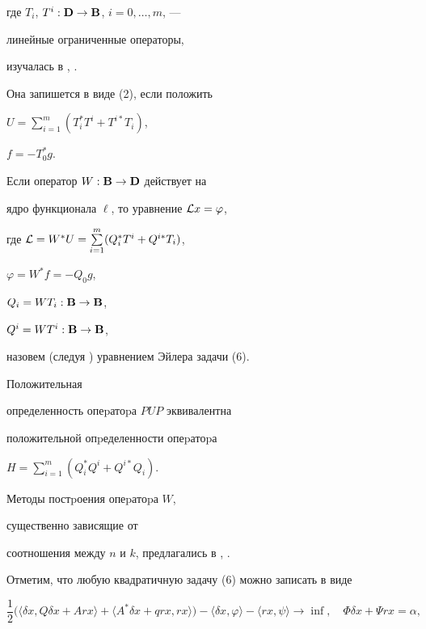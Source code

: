 где $T_i$, $T^i:\bold D\to\bold B$, $i=0,\dotsc,m$, ---


линейные ограниченные операторы,


изучалась в \cite{AR}, \cite{G}.


Она запишется в виде (2), если положить


$U=\sum\limits_{i=1}^m(T_i^*T^i+T^{i*}T_i)$,


$f=-T_0^*g$.





Если оператор $W:\bold B\to\bold D$ действует на


ядро функционала $\ell$, то уравнение ${\cal L}x=\varphi$,


где ${\cal L}=W^*U=\sum\limits_{i=1}^m(Q_i^*T^i+Q^{i*}T_i)$,


$\varphi=W^*f=-Q_0g$,


$Q_i=WT_i:\bold B\to\bold B$,


$Q^i=WT^i:\bold B\to\bold B$,


назовем (следуя \cite{AR}) уравнением Эйлера задачи (6).


Положительная


определенность опеpатоpа $PUP$ эквивалентна


положительной опpеделенности опеpатоpа


$H=\sum\limits_{i=1}^m(Q_i^*Q^i+Q^{i*}Q_i)$.





Методы постpоения опеpатоpа $W$,


существенно зависящие от


соотношения между $n$ и $k$, предлагались в \cite{AR}, \cite{G}.





Отметим, что любую квадратичную задачу (6) можно записать в виде


\begin{equation}


\frac12\big(


\langle  \delta x, Q\delta x+Arx\rangle+


\langle A^*\delta x+qrx,rx\rangle\big) -


\langle  \delta x,\varphi\rangle-


\langle  rx,\psi\rangle\longrightarrow\inf,\quad


\Phi\delta x+\Psi rx=\alpha,


\end{equation}


